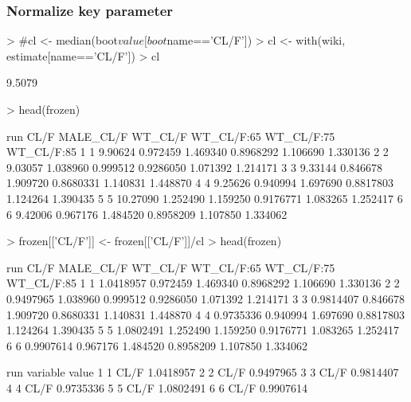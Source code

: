 \subsubsection{Normalize key parameter}
\begin{Schunk}
\begin{Sinput}
> #cl <- median(boot$value[boot$name=='CL/F'])
> cl <- with(wiki, estimate[name=='CL/F'])
> cl
\end{Sinput}
\begin{Soutput}
[1] 9.5079
\end{Soutput}
\begin{Sinput}
> head(frozen)
\end{Sinput}
\begin{Soutput}
  run     CL/F MALE_CL/F  WT_CL/F WT_CL/F:65 WT_CL/F:75 WT_CL/F:85
1   1  9.90624  0.972459 1.469340  0.8968292   1.106690   1.330136
2   2  9.03057  1.038960 0.999512  0.9286050   1.071392   1.214171
3   3  9.33144  0.846678 1.909720  0.8680331   1.140831   1.448870
4   4  9.25626  0.940994 1.697690  0.8817803   1.124264   1.390435
5   5 10.27090  1.252490 1.159250  0.9176771   1.083265   1.252417
6   6  9.42006  0.967176 1.484520  0.8958209   1.107850   1.334062
\end{Soutput}
\begin{Sinput}
> frozen[['CL/F']] <- frozen[['CL/F']]/cl
> head(frozen)
\end{Sinput}
\begin{Soutput}
  run      CL/F MALE_CL/F  WT_CL/F WT_CL/F:65 WT_CL/F:75 WT_CL/F:85
1   1 1.0418957  0.972459 1.469340  0.8968292   1.106690   1.330136
2   2 0.9497965  1.038960 0.999512  0.9286050   1.071392   1.214171
3   3 0.9814407  0.846678 1.909720  0.8680331   1.140831   1.448870
4   4 0.9735336  0.940994 1.697690  0.8817803   1.124264   1.390435
5   5 1.0802491  1.252490 1.159250  0.9176771   1.083265   1.252417
6   6 0.9907614  0.967176 1.484520  0.8958209   1.107850   1.334062
\end{Soutput}
\begin{Soutput}
  run variable     value
1   1     CL/F 1.0418957
2   2     CL/F 0.9497965
3   3     CL/F 0.9814407
4   4     CL/F 0.9735336
5   5     CL/F 1.0802491
6   6     CL/F 0.9907614
\end{Soutput}
\end{Schunk}
